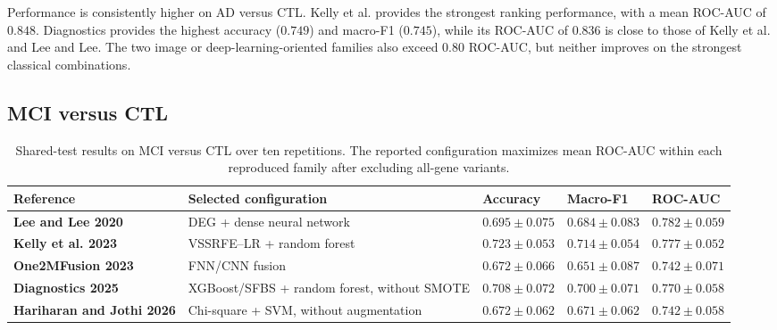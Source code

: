 Performance is consistently higher on AD versus CTL. Kelly et al. provides the strongest ranking performance, with a mean ROC-AUC of \(0.848\). Diagnostics provides the highest accuracy (\(0.749\)) and macro-F1 (\(0.745\)), while its ROC-AUC of \(0.836\) is close to those of Kelly et al. and Lee and Lee. The two image or deep-learning-oriented families also exceed \(0.80\) ROC-AUC, but neither improves on the strongest classical combinations.

\subsection*{MCI versus CTL}

\begin{table}[htbp]
\centering
\begingroup
\footnotesize
\renewcommand{\arraystretch}{1.35}
\setlength{\tabcolsep}{3.5pt}
\begin{tabularx}{\textwidth}{
    >{\raggedright\arraybackslash}p{}
    >{\raggedright\arraybackslash}X
    >{\centering\arraybackslash}p{}
    >{\centering\arraybackslash}p{}
    >{\centering\arraybackslash}p{}
}
\toprule
\rowcolor{gray!18}
\textbf{Reference} &
\textbf{Selected configuration} &
\textbf{Accuracy} &
\textbf{Macro-F1} &
\textbf{ROC-AUC} \\
\midrule

\textbf{Lee and Lee 2020} &
DEG + dense neural network &
\(0.695 \pm 0.075\) &
\(0.684 \pm 0.083\) &
\(\mathbf{0.782 \pm 0.059}\) \\

\rowcolor{gray!5}
\textbf{Kelly et al. 2023} &
VSSRFE--LR + random forest &
\(\mathbf{0.723 \pm 0.053}\) &
\(\mathbf{0.714 \pm 0.054}\) &
\(0.777 \pm 0.052\) \\

\textbf{One2MFusion 2023} &
FNN/CNN fusion &
\(0.672 \pm 0.066\) &
\(0.651 \pm 0.087\) &
\(0.742 \pm 0.071\) \\

\rowcolor{gray!5}
\textbf{Diagnostics 2025} &
XGBoost/SFBS + random forest, without SMOTE &
\(0.708 \pm 0.072\) &
\(0.700 \pm 0.071\) &
\(0.770 \pm 0.058\) \\

\textbf{Hariharan and Jothi 2026} &
Chi-square + SVM, without augmentation &
\(0.672 \pm 0.062\) &
\(0.671 \pm 0.062\) &
\(0.742 \pm 0.058\) \\

\bottomrule
\end{tabularx}
\endgroup
\caption{Shared-test results on MCI versus CTL over ten repetitions. The reported configuration maximizes mean ROC-AUC within each reproduced family after excluding all-gene variants.}
\label{tab:mci-ctl-sota-results}
\end{table}

